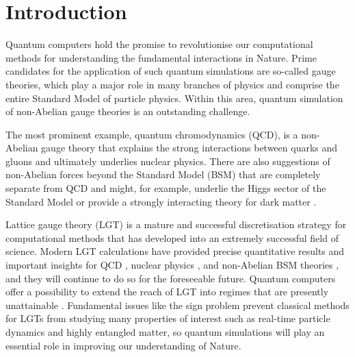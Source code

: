 \documentclass[twocolumn,aps,showpacs,prb,superscriptaddress,floatfix,10pt,nofootinbib]{revtex4-2}
\begin{document}
\maketitle
\def\thefootnote{*}

\section*{Introduction}

Quantum computers hold the promise to revolutionise our computational methods for understanding the fundamental interactions in Nature. Prime candidates for the application of such quantum simulations are so-called gauge theories, which play a major role in many branches of physics and comprise the entire Standard Model of particle physics. Within this area, quantum simulation of non-Abelian gauge theories is an outstanding challenge. 

The most prominent example, quantum chromodynamics (QCD), is a non-Abelian gauge theory that explains the strong interactions between quarks and gluons and ultimately underlies nuclear physics. There are also suggestions of non-Abelian forces beyond the Standard Model (BSM) that are completely separate from QCD and might, for example, underlie the Higgs sector of the Standard Model \cite{Panico:2015jxa} or provide a strongly interacting theory for dark matter \cite{Tulin:2017ara}. 

Lattice gauge theory (LGT) \cite{Wilson1974sk} is a mature and successful discretisation strategy for computational methods that has developed into an extremely successful field of science. Modern LGT calculations have provided precise quantitative results and important insights for QCD \cite{Gattringer:2010zz}, nuclear physics \cite{Detmold:2019ghl}, and non-Abelian BSM theories \cite{Kribs:2016cew}, and they will continue to do so for the foreseeable future. Quantum computers offer a possibility to extend the reach of LGT into regimes that are presently unattainable \cite{jordan_quantum_2012}. Fundamental issues like the sign problem \cite{troyer2005computational} prevent classical methods for LGTs from studying many properties of interest such as real-time particle dynamics and highly entangled matter, so quantum simulations will play an essential role in improving our understanding of Nature. 
\end{document}
